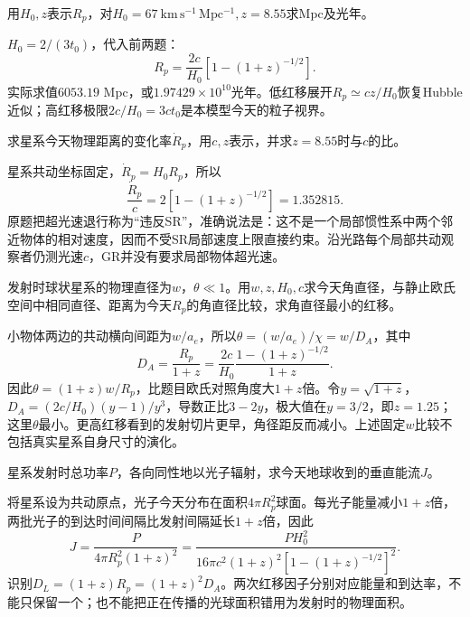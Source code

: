 \begin{exercise}
用$H_0,z$表示$R_p$，对$H_0=67\ \mathrm{km\,s^{-1}\,Mpc^{-1}},z=8.55$求Mpc及光年。
\end{exercise}
\begin{solution}
$H_0=2/(3t_0)$，代入前两题：
\[
 R_p=\frac{2c}{H_0}\left[1-(1+z)^{-1/2}\right].
\]
实际求值$6053.19$ Mpc，或$1.97429\times10^{10}$光年。低红移展开$R_p\simeq cz/H_0$恢复Hubble近似；高红移极限$2c/H_0=3ct_0$是本模型今天的粒子视界。
\end{solution}

\begin{exercise}
求星系今天物理距离的变化率$\dot R_p$，用$c,z$表示，并求$z=8.55$时与$c$的比。
\end{exercise}
\begin{solution}
星系共动坐标固定，$\dot R_p=H_0R_p$，所以
\[
 \frac{\dot R_p}{c}=2[1-(1+z)^{-1/2}]=1.352815.
\]
原题把超光速退行称为“违反SR”，准确说法是：这不是一个局部惯性系中两个邻近物体的相对速度，因而不受SR局部速度上限直接约束。沿光路每个局部共动观察者仍测光速$c$，GR并没有要求局部物体超光速。
\end{solution}

\begin{exercise}
发射时球状星系的物理直径为$w$，$\theta\ll1$。用$w,z,H_0,c$求今天角直径，与静止欧氏空间中相同直径、距离为今天$R_p$的角直径比较，求角直径最小的红移。
\end{exercise}
\begin{solution}
小物体两边的共动横向间距为$w/a_e$，所以$\theta=(w/a_e)/\chi=w/D_A$，其中
\[
 D_A=\frac{R_p}{1+z}
 =\frac{2c}{H_0}\frac{1-(1+z)^{-1/2}}{1+z}.
\]
因此$\theta=(1+z)w/R_p$，比题目欧氏对照角度大$1+z$倍。令$y=\sqrt{1+z}$，$D_A=(2c/H_0)(y-1)/y^3$，导数正比$3-2y$，极大值在$y=3/2$，即$z=1.25$；这里$\theta$最小。更高红移看到的发射切片更早，角径距反而减小。上述固定$w$比较不包括真实星系自身尺寸的演化。
\end{solution}

\begin{exercise}
星系发射时总功率$P$，各向同性地以光子辐射，求今天地球收到的垂直能流$J$。
\end{exercise}
\begin{solution}
将星系设为共动原点，光子今天分布在面积$4\pi R_p^2$球面。每光子能量减小$1+z$倍，两批光子的到达时间间隔比发射间隔延长$1+z$倍，因此
\[
 J=\frac{P}{4\pi R_p^2(1+z)^2}
 =\frac{PH_0^2}{16\pi c^2(1+z)^2[1-(1+z)^{-1/2}]^2}.
\]
识别$D_L=(1+z)R_p=(1+z)^2D_A$。两次红移因子分别对应能量和到达率，不能只保留一个；也不能把正在传播的光球面积错用为发射时的物理面积。
\end{solution}
